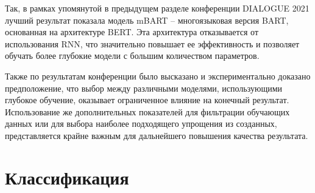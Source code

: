 Так, в рамках упомянутой в предыдущем разделе конференции DIALOGUE 2021 лучший результат показала модель mBART -- многоязыковая версия BART, основанная на архитектуре BERT. Эта архитектура отказывается от использования RNN, что значительно повышает ее эффективность и позволяет обучать более глубокие модели с большим количеством параметров.

Также по результатам конференции было высказано и экспериментально доказано предположение, что выбор между различными моделями, использующими глубокое обучение, оказывает ограниченное влияние на конечный результат. Использование же дополнительных показателей для фильтрации обучающих данных или для выбора наиболее подходящего упрощения из созданных, представляется крайне важным для дальнейшего повышения качества результата. 

\section{Классификация}

